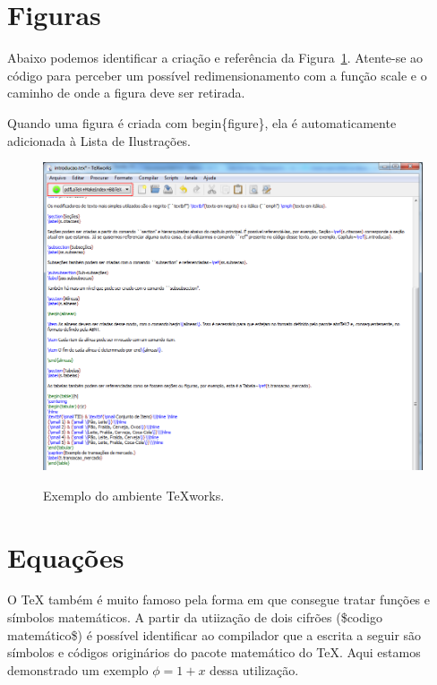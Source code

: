 \section{Figuras}
\label{s.figuras}

Abaixo podemos identificar a criação e referência da Figura~\ref{f.disposicao_mercado}. Atente-se ao código para perceber um possível redimensionamento com a função scale e o caminho de onde a figura deve ser retirada.

Quando uma figura é criada com begin\{figure\}, ela é automaticamente adicionada à Lista de Ilustrações.

\begin{figure}[h]
\caption{\small Exemplo do ambiente TeXworks.}
\centering
\includegraphics[scale=0.50]{figs/tex_exemplo.png}
\label{f.disposicao_mercado}
\end{figure}

\section{Equações}
\label{s.equacoes}

O TeX também é muito famoso pela forma em que consegue tratar funções e símbolos matemáticos. A partir da utiização de dois cifrões (\$codigo matemático\$) é possível identificar ao compilador que a escrita a seguir são símbolos e códigos originários do pacote matemático do TeX. Aqui estamos demonstrado um exemplo $\phi = 1 + x$ dessa utilização.

